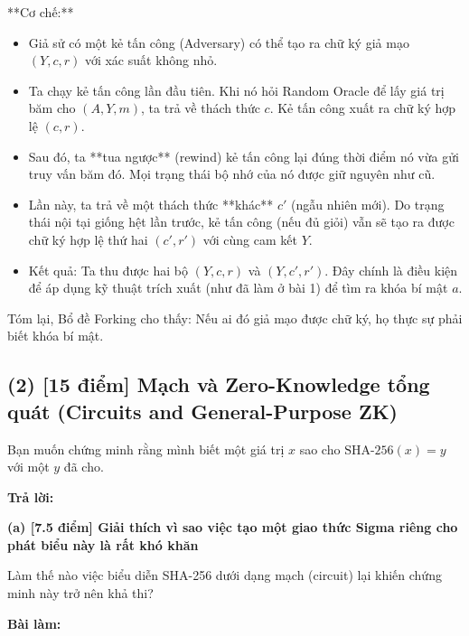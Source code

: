 **Cơ chế:**
\begin{itemize}
    \item Giả sử có một kẻ tấn công (Adversary) có thể tạo ra chữ ký giả mạo $(Y, c, r)$ với xác suất không nhỏ.
    \item Ta chạy kẻ tấn công lần đầu tiên. Khi nó hỏi Random Oracle để lấy giá trị băm cho $(A, Y, m)$, ta trả về thách thức $c$. Kẻ tấn công xuất ra chữ ký hợp lệ $(c, r)$.
    \item Sau đó, ta **tua ngược** (rewind) kẻ tấn công lại đúng thời điểm nó vừa gửi truy vấn băm đó. Mọi trạng thái bộ nhớ của nó được giữ nguyên như cũ.
    \item Lần này, ta trả về một thách thức **khác** $c'$ (ngẫu nhiên mới). Do trạng thái nội tại giống hệt lần trước, kẻ tấn công (nếu đủ giỏi) vẫn sẽ tạo ra được chữ ký hợp lệ thứ hai $(c', r')$ với cùng cam kết $Y$.
    \item Kết quả: Ta thu được hai bộ $(Y, c, r)$ và $(Y, c', r')$. Đây chính là điều kiện để áp dụng kỹ thuật trích xuất (như đã làm ở bài 1) để tìm ra khóa bí mật $a$.
\end{itemize}
Tóm lại, Bổ đề Forking cho thấy: Nếu ai đó giả mạo được chữ ký, họ thực sự phải biết khóa bí mật.

\vspace{0.5cm}

\subsection{(2) [15 điểm] Mạch và Zero-Knowledge tổng quát (Circuits and General-Purpose ZK)}

Bạn muốn chứng minh rằng mình biết một giá trị $x$ sao cho
$\text{SHA-256}(x) = y$
với một $y$ đã cho.

\begin{center}
    \textbf{Trả lời:}
\end{center}

\textbf{(a) [7.5 điểm] Giải thích vì sao việc tạo một giao thức Sigma riêng cho phát biểu này là rất khó khăn}

Làm thế nào việc biểu diễn SHA-256 dưới dạng mạch (circuit) lại khiến chứng minh này trở nên khả thi?

\textbf{Bài làm:}

